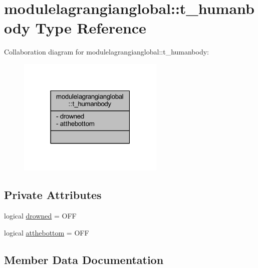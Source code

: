 \hypertarget{structmodulelagrangianglobal_1_1t__humanbody}{}\section{modulelagrangianglobal\+:\+:t\+\_\+humanbody Type Reference}
\label{structmodulelagrangianglobal_1_1t__humanbody}


Collaboration diagram for modulelagrangianglobal\+:\+:t\+\_\+humanbody\+:\nopagebreak
\begin{figure}[H]
\begin{center}
\leavevmode
\includegraphics[width=198pt]{structmodulelagrangianglobal_1_1t__humanbody__coll__graph}
\end{center}
\end{figure}
\subsection*{Private Attributes}
\begin{DoxyCompactItemize}
\item 
logical \mbox{\hyperlink{structmodulelagrangianglobal_1_1t__humanbody_ad9b628045d9171ef0fb185ee33cfd5ef}{drowned}} = O\+FF
\item 
logical \mbox{\hyperlink{structmodulelagrangianglobal_1_1t__humanbody_aa64a0d0757e1b1928b48dc77a68a29a9}{atthebottom}} = O\+FF
\end{DoxyCompactItemize}


\subsection{Member Data Documentation}
\mbox{\label{structmodulelagrangianglobal_1_1t__humanbody_aa64a0d0757e1b1928b48dc77a68a29a9}} 
